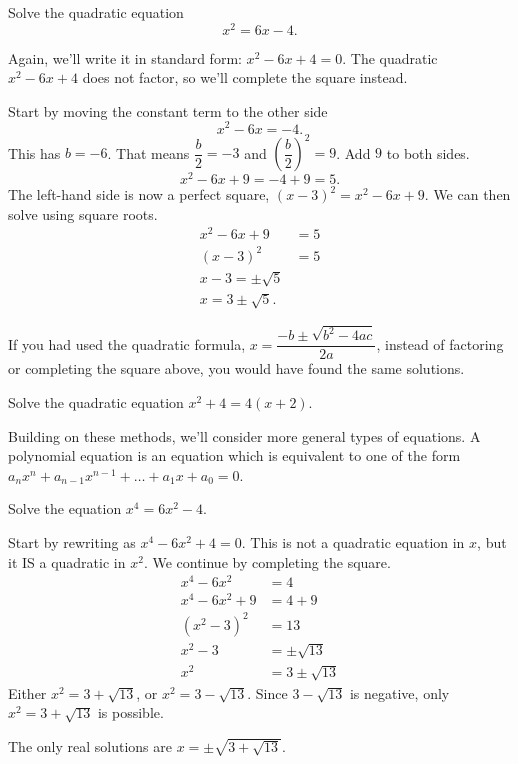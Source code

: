 \documentclass{ximera}
\begin{document}
\begin{example}
	Solve the quadratic equation
	\[  x^2 = 6x -4.\]
	\begin{explanation}
		Again, we'll write it in standard form: $x^2 - 6x + 4 = 0$.  The quadratic $x^2 -6x+4$ does not factor, so we'll complete the square instead.
		
		Start by moving the constant term to the other side
		\[ x^2 - 6x = -4. \]
		This has $b = -6$.  That means $\displaystyle \dfrac{b}{2} = -3$ and $\displaystyle \left( \dfrac{b}{2}\right)^2 = 9$.  Add $9$ to both sides.
		\[ x^2 - 6x + 9 = -4 + 9 = 5. \]
		The left-hand side is now a perfect square, $\left(x-3\right)^2 = x^2 - 6x + 9$.  We can then solve using square roots.
		\begin{align*}
			x^2 - 6x + 9 &=  5\\
			\left( x-3 \right)^2 &= 5\\
			x-3 = \pm \sqrt{5} \\
			x = 3 \pm \sqrt{5}.
		\end{align*}
	\end{explanation}
\end{example}
If you had used the quadratic formula, $\displaystyle x = \dfrac{-b \pm \sqrt{b^2-4ac}}{2a}$, instead of factoring or completing the square above, you would have found the same solutions.

\begin{problem}
	Solve the quadratic equation $\displaystyle x^2 + 4 = 4\left(x+2\right)$.
	\begin{multipleChoice}
  \end{multipleChoice}
\end{problem}




Building on these methods, we'll consider more general types of equations.
A polynomial equation is an equation which is equivalent to one of the form $a_n x^n + a_{n-1} x^{n-1} + \dots + a_1 x + a_0 = 0$. 
\begin{example}
	Solve the equation $x^4 = 6x^2 - 4$.
	\begin{explanation}
		Start by rewriting as $x^4 - 6x^2 + 4=0$.  This is not a quadratic equation in $x$, but it IS a quadratic in $x^2$.
		We continue by completing the square.
		\begin{align*}
			x^4 - 6x^2 &= 4 \\
			x^4 - 6x^2 + 9 &= 4 + 9\\
			(x^2 - 3)^2 &= 13\\
			x^2 - 3 &= \pm \sqrt{13}\\
			x^2 &= 3 \pm \sqrt{13}
		\end{align*}
		Either $x^2 = 3 + \sqrt{13}$, or $x^2 = 3 - \sqrt{13}$.  Since $3 - \sqrt{13}$ is negative, only $x^2 = 3 + \sqrt{13}$ is possible.
		
		The only real solutions are $x = \pm \sqrt{3 + \sqrt{13}}$.
	\end{explanation}
\end{example}
\end{document}
